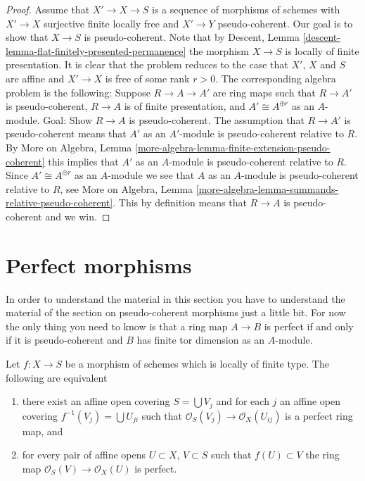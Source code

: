 \begin{proof}
\medskip\noindent
Assume that $X' \to X \to S$ is a sequence of morphisms of schemes
with $X' \to X$ surjective finite locally free and $X' \to Y$ pseudo-coherent.
Our goal is to show that $X \to S$ is pseudo-coherent.
Note that by
Descent, Lemma \ref{descent-lemma-flat-finitely-presented-permanence}
the morphism $X \to S$ is locally of finite presentation.
It is clear that the problem reduces to the case that $X'$, $X$ and $S$
are affine and $X' \to X$ is free of some rank $r > 0$. The corresponding
algebra problem is the following: Suppose $R \to A \to A'$ are ring maps
such that $R \to A'$ is pseudo-coherent, $R \to A$ is of finite presentation,
and $A' \cong A^{\oplus r}$ as an $A$-module. Goal: Show $R \to A$ is
pseudo-coherent. The assumption that $R \to A'$ is pseudo-coherent
means that $A'$ as an $A'$-module is pseudo-coherent relative to $R$. By
More on Algebra,
Lemma \ref{more-algebra-lemma-finite-extension-pseudo-coherent}
this implies that $A'$ as an $A$-module is pseudo-coherent relative to $R$.
Since $A' \cong A^{\oplus r}$ as an $A$-module we see that
$A$ as an $A$-module is pseudo-coherent relative to $R$, see
More on Algebra,
Lemma \ref{more-algebra-lemma-summands-relative-pseudo-coherent}.
This by definition means that $R \to A$ is pseudo-coherent and we win.
\end{proof}








\section{Perfect morphisms}
\label{section-perfect}

\noindent
In order to understand the material in this
section you have to understand the material of the section
on pseudo-coherent morphisms just a little bit.
For now the only thing you need to know is that a ring map
$A \to B$ is perfect if and only if it is pseudo-coherent
and $B$ has finite tor dimension as an $A$-module.

\begin{lemma}
\label{lemma-perfect}
Let $f : X \to S$ be a morphism of schemes which is locally of finite type.
The following are equivalent
\begin{enumerate}
\item there exist an affine open covering $S = \bigcup V_j$ and for each $j$
an affine open covering $f^{-1}(V_j) = \bigcup U_{ji}$ such that
$\mathcal{O}_S(V_j) \to \mathcal{O}_X(U_{ij})$ is a perfect
ring map, and
\item for every pair of affine opens $U \subset X$, $V \subset S$
such that $f(U) \subset V$ the ring map
$\mathcal{O}_S(V) \to \mathcal{O}_X(U)$ is perfect.
\end{enumerate}
\end{lemma}

